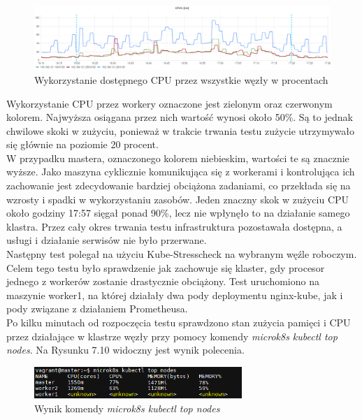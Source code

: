 \begin{figure}[H]
    \centering
    \includegraphics[width=1\textwidth]{img2/test1/cpu.png}
    \caption{Wykorzystanie dostępnego CPU przez wszystkie węzły w procentach}
\end{figure}

Wykorzystanie CPU przez workery oznaczone jest zielonym oraz czerwonym kolorem. Najwyższa osiągana przez nich wartość wynosi około 50\%. Są to jednak chwilowe skoki w zużyciu, ponieważ w trakcie trwania testu zużycie utrzymywało się głównie na poziomie 20 procent.\\

W przypadku mastera, oznaczonego kolorem niebieskim, wartości te są znacznie wyższe. Jako maszyna cyklicznie komunikująca się z workerami i kontrolująca ich zachowanie jest zdecydowanie bardziej obciążona zadaniami, co przekłada się na wzrosty i spadki w wykorzystaniu zasobów. Jeden znaczny skok w zużyciu CPU około godziny 17:57 sięgał ponad 90\%, lecz nie wpłynęło to na działanie samego klastra. Przez cały okres trwania testu infrastruktura pozostawała dostępna, a usługi i działanie serwisów nie było przerwane. \\

Następny test polegał na użyciu Kube-Stresscheck na wybranym węźle roboczym. Celem tego testu było sprawdzenie jak zachowuje się klaster, gdy procesor jednego z workerów zostanie drastycznie obciążony. Test uruchomiono na maszynie worker1, na której działały dwa pody deploymentu nginx-kube, jak i pody związane z działaniem Prometheusa.\\

Po kilku minutach od rozpoczęcia testu sprawdzono stan zużycia pamięci i CPU przez działające w klastrze węzły przy pomocy komendy \textit{microk8s kubectl top nodes}. Na Rysunku 7.10 widoczny jest wynik polecenia. 

\begin{figure}[H]
    \centering
    \includegraphics[width=0.7\textwidth]{img2/test2/top.png}
    \caption{Wynik komendy \textit{microk8s kubectl top nodes}}
\end{figure}

